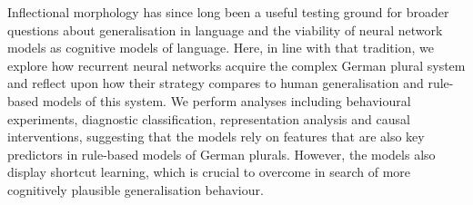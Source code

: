 Inflectional morphology has since long been a useful testing ground for broader questions about generalisation in language and the viability of neural network models as cognitive models of language. Here, in line with that tradition, we explore how recurrent neural networks acquire the complex German plural system and reflect upon how their strategy compares to human generalisation and rule-based models of this system. We perform analyses including behavioural experiments, diagnostic classification, representation analysis and causal interventions, suggesting that the models rely on features that are also key predictors in rule-based models of German plurals. However, the models also display shortcut learning, which is crucial to overcome in search of more cognitively plausible generalisation behaviour.
